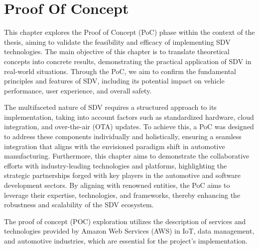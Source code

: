  \lstset{numbers=left}
 
\chapter{Proof Of Concept} \label{ch:proofOfConcept}

This chapter explores the Proof of Concept (PoC) phase within the context of the thesis, aiming to validate the feasibility and efficacy of implementing SDV technologies. The main objective of this chapter is to translate theoretical concepts into concrete results, demonstrating the practical application of SDV in real-world situations. Through the PoC, we aim to confirm the fundamental principles and features of SDV, including its potential impact on vehicle performance, user experience, and overall safety.

The multifaceted nature of SDV requires a structured approach to its implementation, taking into account factors such as standardized hardware, cloud integration, and over-the-air (OTA) updates. To achieve this, a PoC was designed to address these components individually and holistically, ensuring a seamless integration that aligns with the envisioned paradigm shift in automotive manufacturing. Furthermore, this chapter aims to demonstrate the collaborative efforts with industry-leading technologies and platforms, highlighting the strategic partnerships forged with key players in the automotive and software development sectors. By aligning with renowned entities, the PoC aims to leverage their expertise, technologies, and frameworks, thereby enhancing the robustness and scalability of the SDV ecosystem.


The proof of concept (POC) exploration utilizes the description of services and technologies provided by Amazon Web Services (AWS) in IoT, data management, and automotive industries, which are essential for the project's implementation.

